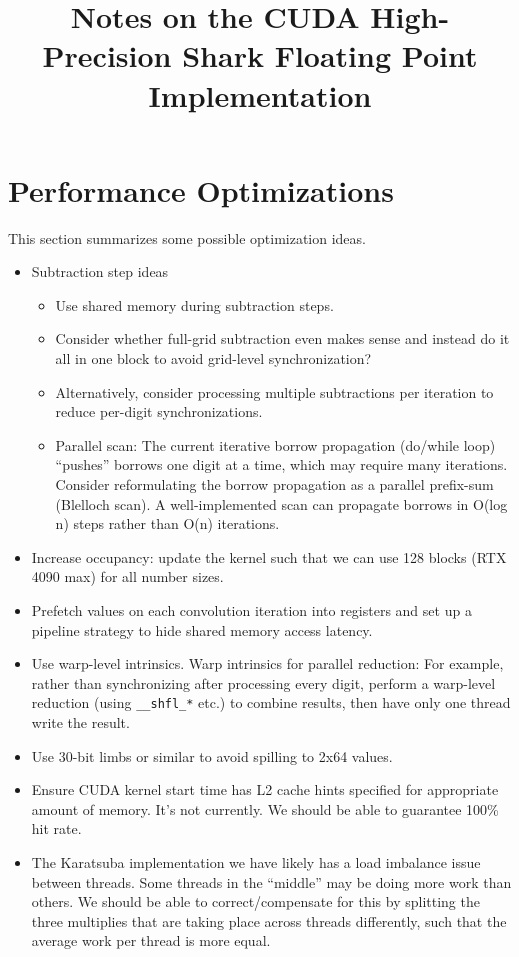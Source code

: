 \documentclass[12pt]{article}
\title{Notes on the CUDA High-Precision Shark Floating Point Implementation}
\author{}
\date{}
\begin{document}
\maketitle

\section{Performance Optimizations}

This section summarizes some possible optimization ideas.

\begin{itemize}
\item Subtraction step ideas
    \begin{itemize}
    \item Use shared memory during subtraction steps.
    \item Consider whether full-grid subtraction even makes sense and instead do it all in one block to avoid grid-level synchronization?
    \item Alternatively, consider processing multiple subtractions per iteration to reduce per-digit synchronizations.
    \item Parallel scan:  The current iterative borrow propagation (do/while loop) ``pushes'' borrows one digit at a time, which may require many iterations. Consider reformulating the borrow propagation as a parallel prefix-sum (Blelloch scan). A well-implemented scan can propagate borrows in O(log n) steps rather than O(n) iterations.
    \end{itemize}
\item Increase occupancy: update the kernel such that we can use 128 blocks (RTX 4090 max) for all number sizes.
\item Prefetch values on each convolution iteration into registers and set up a pipeline strategy to hide shared memory access latency.
\item Use warp-level intrinsics.  Warp intrinsics for parallel reduction: For example, rather than synchronizing after processing every digit, perform a warp-level reduction (using \verb|__shfl_*| etc.) to combine results, then have only one thread write the result.
\item Use 30-bit limbs or similar to avoid spilling to 2x64 values.
\item Ensure CUDA kernel start time has L2 cache hints specified for appropriate amount of memory.  It's not currently.  We should be able to guarantee 100\% hit rate.
\item The Karatsuba implementation we have likely has a load imbalance issue between threads.  Some threads in the ``middle'' may be doing more work than others.  We should be able to correct/compensate for this by splitting the three multiplies that are taking place across threads differently, such that the average work per thread is more equal.

\end{itemize}
\end{document}
